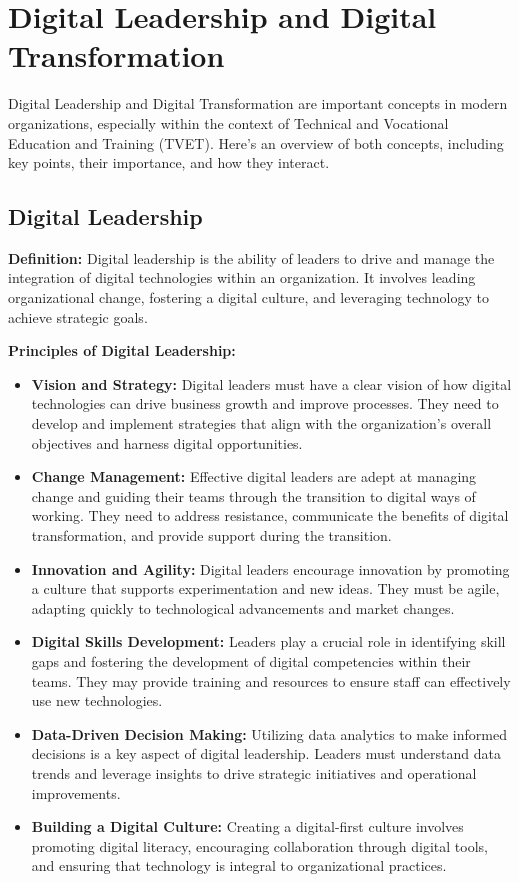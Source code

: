 \documentclass[10pt]{article}
\begin{document}
\section*{Digital Leadership and Digital Transformation}

Digital Leadership and Digital Transformation are important concepts in modern organizations, especially within the context of Technical and Vocational Education and Training (TVET). Here's an overview of both concepts, including key points, their importance, and how they interact.

\subsection*{Digital Leadership}

\textbf{Definition:} Digital leadership is the ability of leaders to drive and manage the integration of digital technologies within an organization. It involves leading organizational change, fostering a digital culture, and leveraging technology to achieve strategic goals.

\textbf{Principles of Digital Leadership:}
\begin{itemize}
    \item \textbf{Vision and Strategy:} Digital leaders must have a clear vision of how digital technologies can drive business growth and improve processes. They need to develop and implement strategies that align with the organization's overall objectives and harness digital opportunities.
    \item \textbf{Change Management:} Effective digital leaders are adept at managing change and guiding their teams through the transition to digital ways of working. They need to address resistance, communicate the benefits of digital transformation, and provide support during the transition.
    \item \textbf{Innovation and Agility:} Digital leaders encourage innovation by promoting a culture that supports experimentation and new ideas. They must be agile, adapting quickly to technological advancements and market changes.
    \item \textbf{Digital Skills Development:} Leaders play a crucial role in identifying skill gaps and fostering the development of digital competencies within their teams. They may provide training and resources to ensure staff can effectively use new technologies.
    \item \textbf{Data-Driven Decision Making:} Utilizing data analytics to make informed decisions is a key aspect of digital leadership. Leaders must understand data trends and leverage insights to drive strategic initiatives and operational improvements.
    \item \textbf{Building a Digital Culture:} Creating a digital-first culture involves promoting digital literacy, encouraging collaboration through digital tools, and ensuring that technology is integral to organizational practices.
\end{itemize}
\end{document}
